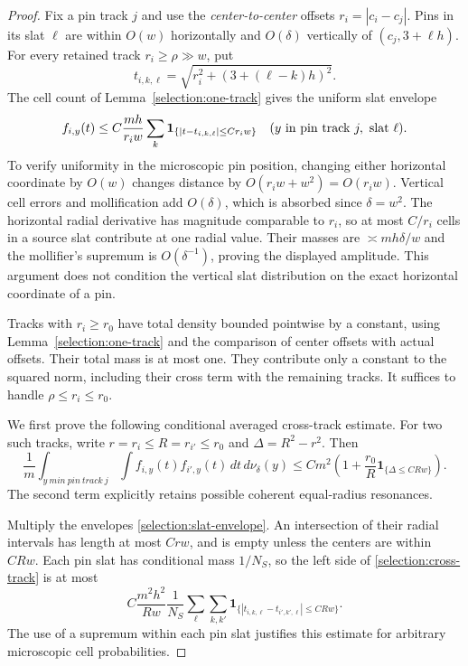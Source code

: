 \begin{proof}
Fix a pin track \(j\) and use the \emph{center-to-center} offsets
\(r_i=|c_i-c_j|\). Pins in its slat \(\ell\) are within \(O(w)\)
horizontally and \(O(\delta)\) vertically of \((c_j,3+\ell h)\).
For every retained track \(r_i\ge\rho\gg w\), put
\[
 t_{i,k,\ell}=\sqrt{r_i^2+(3+(\ell-k)h)^2}.
\]
The cell count of Lemma~\ref{selection:one-track} gives the uniform
slat envelope
\begin{equation}\label{selection:slat-envelope}
 f_{i,y}(t)\le
 C\frac{mh}{r_iw}\sum_k
 \mathbf1_{\{|t-t_{i,k,\ell}|\le Cr_iw\}}
 \quad(y\hbox{ in pin track }j,\hbox{ slat }\ell).
\end{equation}
To verify uniformity in the microscopic pin position, changing either
horizontal coordinate by \(O(w)\) changes distance by
\(O(r_iw+w^2)=O(r_iw)\). Vertical cell errors and mollification add
\(O(\delta)\), which is absorbed since \(\delta=w^2\).
The horizontal radial derivative has magnitude comparable to \(r_i\),
so at most \(C/r_i\) cells in a source slat contribute at one radial
value. Their masses are \(\asymp mh\delta/w\) and the mollifier's
supremum is \(O(\delta^{-1})\), proving the displayed amplitude.
This argument does not condition the vertical slat distribution on the
exact horizontal coordinate of a pin.

Tracks with \(r_i\ge r_0\) have total density bounded pointwise by a
constant, using Lemma~\ref{selection:one-track} and the comparison of
center offsets with actual offsets. Their total mass is at most one.
They contribute only a constant to the squared norm, including their
cross term with the remaining tracks. It suffices to handle
\(\rho\le r_i\le r_0\).

We first prove the following conditional averaged cross-track estimate.
For two such tracks, write
\(r=r_i\le R=r_{i'}\le r_0\) and \(\Delta=R^2-r^2\). Then
\begin{equation}\label{selection:cross-track}
 \frac1m\int_{y\ {
m in\ pin\ track}\ j}
       \int f_{i,y}(t)f_{i',y}(t)\,dt\,d\nu_\delta(y)
 \le Cm^2\left(1+\frac{r_0}{R}
               \mathbf1_{\{\Delta\le CRw\}}\right).
\end{equation}
The second term explicitly retains possible coherent equal-radius
resonances.

Multiply the envelopes \eqref{selection:slat-envelope}. An intersection
of their radial intervals has length at most \(Crw\), and is empty
unless the centers are within \(CRw\). Each pin slat has conditional
mass \(1/N_S\), so the left side of \eqref{selection:cross-track}
is at most
\begin{equation}\label{selection:lattice-count}
 C\frac{m^2h^2}{Rw}\frac1{N_S}
 \sum_\ell\sum_{k,k'}
 \mathbf1_{\{|t_{i,k,\ell}-t_{i',k',\ell}|\le CRw\}}.
\end{equation}
The use of a supremum within each pin slat justifies this estimate for
arbitrary microscopic cell probabilities.


\end{proof}
